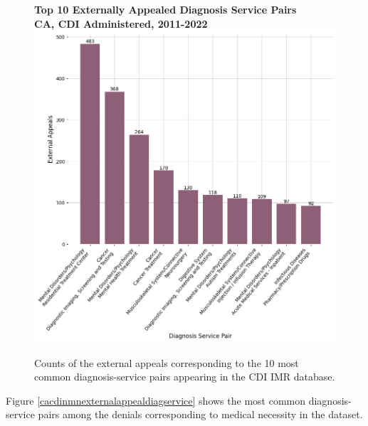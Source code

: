 \documentclass[12pt, a4paper,twoside,parskip=full]{report}
\theoremstyle{plain} %
\theoremstyle{definition} %
\theoremstyle{remark} %
\numberwithin{equation}{chapter}
\begin{document}
		\begin{figure}[h!]
			\centering
			\textbf{Top 10 Externally Appealed Diagnosis Service Pairs}\\
			\textbf{CA, CDI Administered, 2011-2022}\\
			\includegraphics[width=.8\textwidth]{images/ca_doi_external_appeals/top_appealed_diag_services.png}
			\caption{Counts of the external appeals corresponding to the 10 most common diagnosis-service pairs appearing in the CDI IMR database.}
			\label{cacdiexternalappealsbydiagservice}
		\end{figure}
		\clearpage
	
		Figure \ref{cacdinmnexternalappealdiagservice} shows the most common diagnosis-service pairs among the denials corresponding to medical necessity in the dataset.
\end{document}
